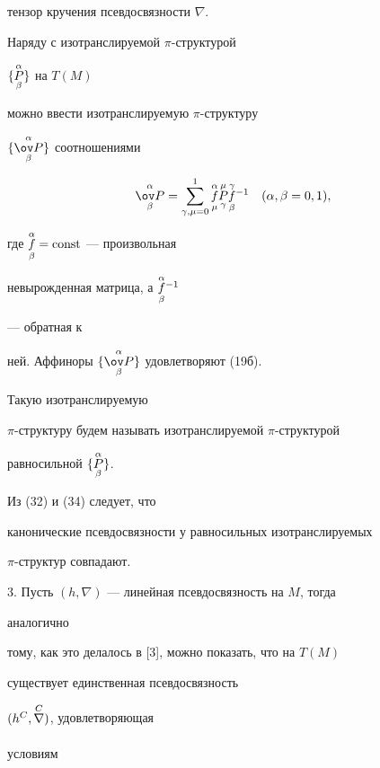 тензор кручения псевдосвязности $\nabla$.





\begin{note}


Наряду с изотранслируемой $\pi$-структурой


$\{\overset{\alpha}{\underset{\beta}{P}}{}\}$ на $T(M)$


можно ввести изотранслируемую $\pi$-структуру


$\{\updown{\alpha}{\beta}{\ov P}\}$ соотношениями


\begin{equation}


\updown{\alpha}{\beta}{\ov P}=\sum^1_{\gamma,\mu=0}


\updown{\alpha}{\mu}{f}\updown{\mu}{\gamma}{P}


\updown{\gamma}{\beta}{f}^{-1} \quad(\alpha,\beta=0,1),


\end{equation}


где $\overset{\alpha}{\underset{\beta}{f}}{}=\text{const}$ --- произвольная


невырожденная матрица, а $\overset{\alpha}{\underset{\beta}{f}}{}^{-1}$


--- обратная к


ней. Аффиноры $\{\updown{\alpha}{\beta}{\ov P}\}$ удовлетворяют (19б).


Такую изотранслируемую


$\pi$-структуру будем называть изотранслируемой $\pi$-структурой


равносильной $\{\overset{\alpha}{\underset{\beta}{P}}{}\}$.


Из (32) и (34) следует, что


канонические псевдосвязности у равносильных изотранслируемых


$\pi$-структур совпадают.


\end{note}





3. Пусть $(h,\nabla)$ --- линейная псевдосвязность на $M$, тогда


аналогично


тому, как это делалось в [3], можно показать, что на $T(M)$


существует единственная псевдосвязность


$(h^C,\overset{C}{\underset{}{\nabla}}{})$, удовлетворяющая


условиям


